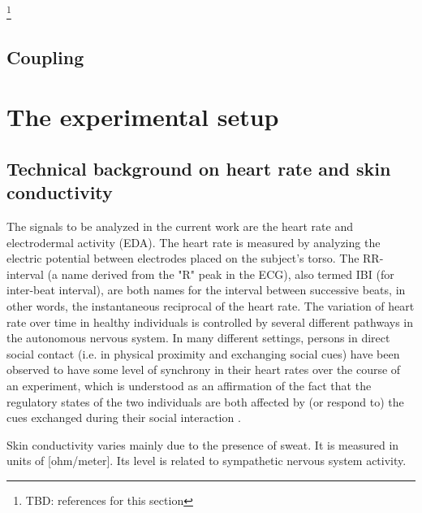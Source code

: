 \documentclass[a4paper, 11pt]{report}      %
\begin{document}
\footnote{TBD: references for this section}

\subsection{Coupling }


\section{The experimental setup}

\subsection{Technical background on heart rate and skin \mbox{conductivity}}
The signals to be analyzed in the current work are the heart rate and electrodermal activity (EDA). 
The heart rate is measured by analyzing the electric potential between electrodes placed on the subject's torso. The RR-interval (a name derived from the "R" peak in the ECG), also termed IBI (for inter-beat interval), are both names for the interval between successive beats, in other words, the instantaneous reciprocal of the heart rate. The variation of heart rate over time in healthy individuals is controlled by several different pathways in the autonomous nervous system. In many different settings, persons in direct social contact (i.e. in physical proximity and exchanging social cues) have been observed to have some level of synchrony in their heart rates over the course of an experiment, which is understood as an affirmation of the fact that the regulatory states of the two individuals are both affected by (or respond to) the cues exchanged during their social interaction \citep{palumbo2017interpersonal}.

Skin conductivity varies mainly due to the presence of sweat. It is measured in units of [ohm\slash meter]. Its level is related to sympathetic nervous system activity.
\end{document}
